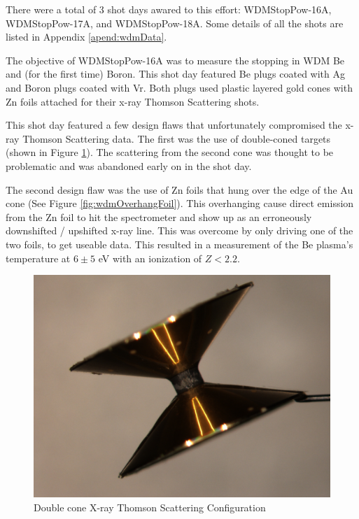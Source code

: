 There were a total of 3 shot days awared to this effort: WDMStopPow-16A, WDMStopPow-17A, and WDMStopPow-18A. Some details of all the shots are listed in Appendix \ref{apend:wdmData}. 

The objective of WDMStopPow-16A was to measure the stopping in WDM Be and (for the first time) Boron. This shot day featured Be plugs coated with Ag and Boron plugs coated with Vr. Both plugs used plastic layered gold cones with Zn foils attached for their x-ray Thomson Scattering shots. 

This shot day featured a few design flaws that unfortunately compromised the x-ray Thomson Scattering data. The first was the use of double-coned targets (shown in Figure \ref{fig:wdmDoubleCone}). The scattering from the second cone was thought to be problematic and was abandoned early on in the shot day. 

The second design flaw was the use of Zn foils that hung over the edge of the Au cone (See Figure \ref{fig:wdmOverhangFoil}). This overhanging cause direct emission from the Zn foil to hit the spectrometer and show up as an erroneously downshifted / upshifted x-ray line. This was overcome by only driving one of the two foils, to get useable data. This resulted in a measurement of the Be plasma's temperature at $6 \pm 5$ eV with an ionization of $Z < 2.2$. 

\begin{figure}[!h]
    \centering
    \includegraphics[scale=0.7]{Figures/wdmDoubleCone.pdf}
    \caption{Double cone X-ray Thomson Scattering Configuration}
    \label{fig:wdmDoubleCone}
\end{figure}

